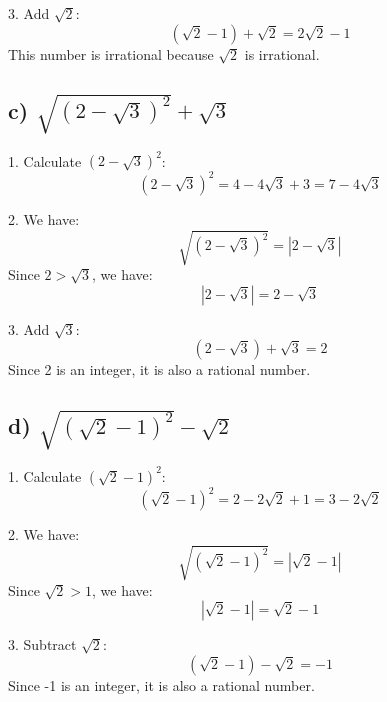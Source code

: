 \documentclass{article}
\begin{document}
3. Add \( \sqrt{2} \):
   \[
   (\sqrt{2} - 1) + \sqrt{2} = 2\sqrt{2} - 1
   \]
   This number is irrational because \( \sqrt{2} \) is irrational.

\subsection*{c) \( \sqrt{(2 - \sqrt{3})^2} + \sqrt{3} \)}

1. Calculate \( (2 - \sqrt{3})^2 \):
   \[
   (2 - \sqrt{3})^2 = 4 - 4\sqrt{3} + 3 = 7 - 4\sqrt{3}
   \]

2. We have:
   \[
   \sqrt{(2 - \sqrt{3})^2} = |2 - \sqrt{3}|
   \]
   Since \( 2 > \sqrt{3} \), we have:
   \[
   |2 - \sqrt{3}| = 2 - \sqrt{3}
   \]

3. Add \( \sqrt{3} \):
   \[
   (2 - \sqrt{3}) + \sqrt{3} = 2
   \]
   Since 2 is an integer, it is also a rational number.

\subsection*{d) \( \sqrt{(\sqrt{2} - 1)^2} - \sqrt{2} \)}

1. Calculate \( (\sqrt{2} - 1)^2 \):
   \[
   (\sqrt{2} - 1)^2 = 2 - 2\sqrt{2} + 1 = 3 - 2\sqrt{2}
   \]

2. We have:
   \[
   \sqrt{(\sqrt{2} - 1)^2} = |\sqrt{2} - 1|
   \]
   Since \( \sqrt{2} > 1 \), we have:
   \[
   |\sqrt{2} - 1| = \sqrt{2} - 1
   \]

3. Subtract \( \sqrt{2} \):
   \[
   (\sqrt{2} - 1) - \sqrt{2} = -1
   \]
   Since -1 is an integer, it is also a rational number.
\end{document}
